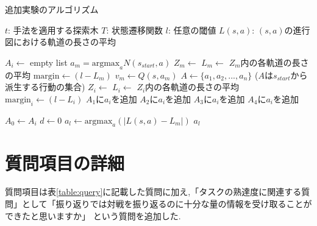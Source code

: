 \begin{algorithm}
    \small
    \caption{追加実験のアルゴリズム}
    \label{alg:myalg-add}
    \begin{algorithmic}[1]
        \State $t$: 手法を適用する探索木
        \State $T$: 状態遷移関数
        \State $l$: 任意の閾値
        \State $L(s, a)$: $(s, a)$の進行図における軌道の長さの平均

        
        
       
               $A_i \gets $ empty list
           \EndFor
           \State $a_m = \textrm{argmax}_a N(s_{start}, a)$
           \State $Z_m \gets$ 
           \State $L_m \gets $ $Z_m$内の各軌道の長さの平均
           \State $\textrm{margin} \gets (l-L_m)$
           \State $v_m \gets Q(s, a_m)$
           \State $A \gets \{a_1, a_2, ..., a_n\}$ ($A$は$s_{start}$から派生する行動の集合)
            \State $Z_i \gets$ 
            \State $L_i \gets $ $Z_i$内の各軌道の長さの平均
            \State $\textrm{margin}_i \gets (l-L_i)$
                    \State $A_1$に$a_i$を追加
                \Else
                    \State $A_2$に$a_i$を追加
                \EndIf
            \Else
                    \State $A_3$に$a_i$を追加
                \Else
                    \State $A_4$に$a_i$を追加
                \EndIf

            \EndIf
           \EndFor

                   $A_0 \gets A_i$
                \EndIf
           \EndFor
           \State $d \gets 0$
           \State $a_l \gets \textrm{argmax}_a (|L(s,a)-L_m|)$
           \State \Return $a_l$
        \EndFunction
    \end{algorithmic}
\end{algorithm}












\section{質問項目の詳細}
質問項目は表\ref{table:query}に記載した質問に加え,「タスクの熟達度に関連する質問」として「振り返りでは対戦を振り返るのに十分な量の情報を受け取ることができたと思いますか」
という質問を追加した.
